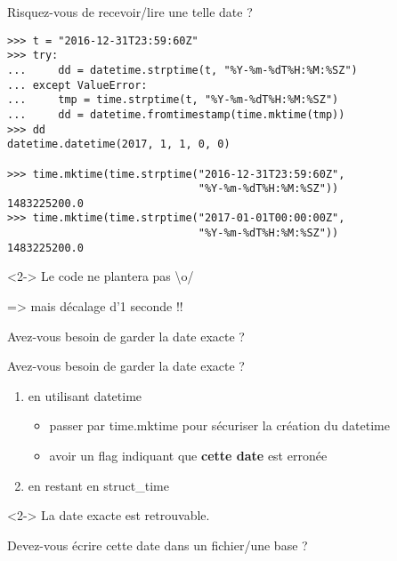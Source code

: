\documentclass[]{beamer}
\begin{document}
\begin{frame}[fragile]{Risquez-vous de recevoir/lire une telle date ?}
\footnotesize{\begin{verbatim}
>>> t = "2016-12-31T23:59:60Z"
>>> try:
...     dd = datetime.strptime(t, "%Y-%m-%dT%H:%M:%SZ")
... except ValueError:
...     tmp = time.strptime(t, "%Y-%m-%dT%H:%M:%SZ")
...     dd = datetime.fromtimestamp(time.mktime(tmp))
>>> dd
datetime.datetime(2017, 1, 1, 0, 0)

>>> time.mktime(time.strptime("2016-12-31T23:59:60Z",
                              "%Y-%m-%dT%H:%M:%SZ"))
1483225200.0
>>> time.mktime(time.strptime("2017-01-01T00:00:00Z",
                              "%Y-%m-%dT%H:%M:%SZ"))
1483225200.0
\end{verbatim}
}
\begin{block}<2->{}
    Le code ne plantera pas \textbackslash o/
    
    => mais décalage d'1 seconde !!
\end{block}
\end{frame}

\begin{frame}[fragile]{Avez-vous besoin de garder la date exacte ?}
\end{frame}

\begin{frame}[fragile]{Avez-vous besoin de garder la date exacte ?}
    \begin{enumerate}
        \item en utilisant datetime
            \begin{itemize}
                \item passer par time.mktime pour sécuriser la création du
                    datetime
                \item avoir un flag indiquant que \textbf{cette date} est
                    erronée
            \end{itemize}
        \item en restant en struct\_time
    \end{enumerate}
    \begin{block}<2->{}
        La date exacte est retrouvable. 
    \end{block}
\end{frame}

\begin{frame}[fragile]{Devez-vous écrire cette date dans un fichier/une base ?}
\end{frame}
\end{document}
